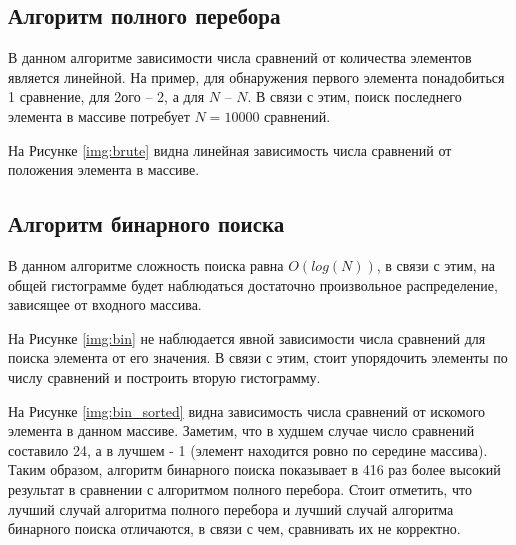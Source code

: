 \clearpage

\subsection{Алгоритм полного перебора}

В данном алгоритме зависимости числа сравнений от количества элементов является линейной. На пример, для обнаружения первого элемента понадобиться 1 сравнение, для 2ого -- 2, а для $N$ -- $N$.  В связи с этим, поиск последнего элемента в массиве потребует $N = 10000$ сравнений. 


На Рисунке \ref{img:brute} видна линейная зависимость числа сравнений от положения элемента в массиве.
\clearpage

\clearpage

\subsection{Алгоритм бинарного поиска}

В данном алгоритме сложность поиска равна $O(log(N))$, в связи с этим, на общей гистограмме будет наблюдаться достаточно произвольное распределение, зависящее от входного массива.


На Рисунке \ref{img:bin} не наблюдается явной зависимости числа сравнений для поиска элемента от его значения. В связи с этим, стоит упорядочить элементы по числу сравнений и построить вторую гистограмму.

\clearpage


На Рисунке \ref{img:bin_sorted} видна зависимость числа сравнений от искомого элемента в данном массиве. Заметим, что в худшем случае число сравнений составило 24, а в лучшем - 1 (элемент находится ровно по середине массива). Таким образом, алгоритм бинарного поиска показывает в 416 раз более высокий результат в сравнении с алгоритмом полного перебора. Стоит отметить, что лучший случай алгоритма полного перебора и лучший случай алгоритма бинарного поиска отличаются, в связи с чем, сравнивать их не корректно.

